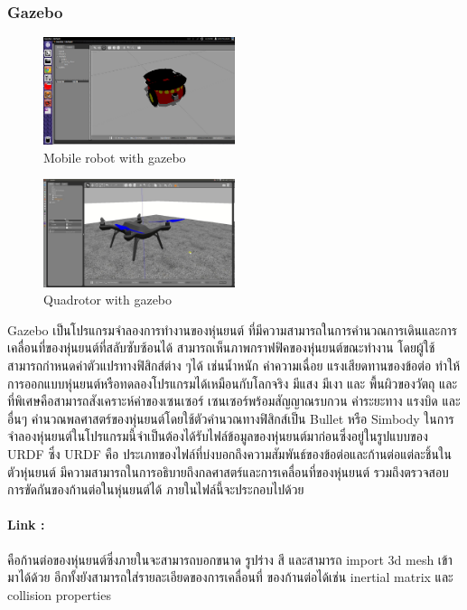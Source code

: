 \subsubsection*{Gazebo}
\begin{figure}[ht]
    \centering
    \includegraphics[width=0.5\textwidth]{chapter2/images/sim_gazebo1.png}
    \caption{Mobile robot with gazebo}
    \label{fig:sim_gazebo1}
\end{figure}
\begin{figure}[ht]
    \centering
    \includegraphics[width=0.5\textwidth]{chapter2/images/sim_gazebo2.jpg}
    \caption{Quadrotor with gazebo}
    \label{fig:sim_gazebo2}
\end{figure}
Gazebo เป็นโปรแกรมจำลองการทำงานของหุ่นยนต์ ที่มีความสามารถในการคำนวณการเดินและการเคลื่อนที่ของหุ่นยนต์ที่สลับซับซ้อนได้ สามารถเห็นภาพกราฟฟิคของหุ่นยนต์ขณะทำงาน โดยผู้ใช้สามารถกำหนดค่าตัวแปรทางฟิสิกส์ต่าง ๆได้ เช่นน้ำหนัก ค่าความเฉื่อย แรงเสียดทานของข้อต่อ ทำให้การออกแบบหุ่นยนต์หรือทดลองโปรแกรมได้เหมือนกับโลกจริง มีแสง มีเงา และ พื้นผิวของวัตถุ และที่พิเศษคือสามารถสังเคราะห์ค่าของเซนเซอร์ เซนเซอร์พร้อมสัญญาณรบกวน ค่าระยะทาง แรงบิด และอื่นๆ คำนวณพลศาสตร์ของหุ่นยนต์โดยใช้ตัวคำนวณทางฟิสิกส์เป็น Bullet หรือ Simbody ในการจำลองหุ่นยนต์ในโปรแกรมนี้จำเป็นต้องได้รับไฟล์ข้อมูลของหุ่นยนต์มาก่อนซึ่งอยู่ในรูปแบบของ URDF ซึ่ง URDF คือ ประเภทของไฟล์ที่บ่งบอกถึงความสัมพันธ์ของข้อต่อและก้านต่อแต่ละชิ้นในตัวหุ่นยนต์ มีความสามารถในการอธิบายถึงกลศาสตร์และการเคลื่อนที่ของหุ่นยนต์ รวมถึงตรวจสอบการขัดกันของก้านต่อในหุ่นยนต์ได้ ภายในไฟล์นี้จะประกอบไปด้วย

\paragraph*{Link :}
คือก้านต่อของหุ่นยนต์ซึ่งภายในจะสามารถบอกขนาด รูปร่าง สี และสามารถ import 3d mesh เข้ามาได้ด้วย อีกทั้งยังสามารถใส่รายละเอียดของการเคลื่อนที่ ของก้านต่อได้เช่น inertial matrix และ collision properties

